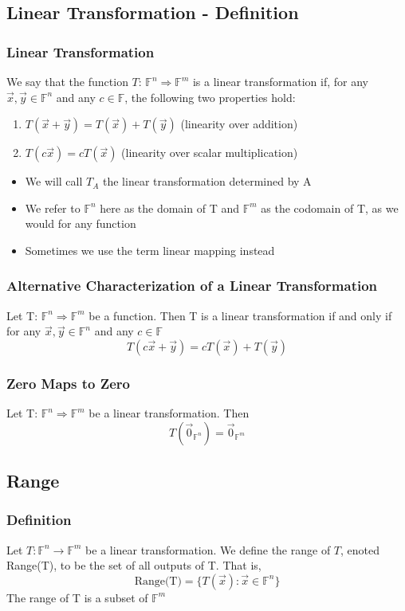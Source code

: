 \documentclass[12pt, letterpaper]{article}
\begin{document}
\subsection{Linear Transformation - Definition} 
\subsubsection{Linear Transformation}
We say that the function $T$: $\mathbb{F}^n\Rightarrow\mathbb{F}^m$ is a linear transformation if, for any $\vec{x}, \vec{y}\in\mathbb{F}^n$
and any $c\in\mathbb{F}$, the following two properties hold:
\begin{enumerate}
    \item $T(\vec{x}+\vec{y}) = T(\vec{x}) + T(\vec{y})$ (linearity over addition)
    \item $T(c\vec{x}) = cT(\vec{x})$ (linearity over scalar multiplication)
\end{enumerate}
\begin{itemize}
    \item We will call $T_A$ the linear transformation determined by A 
    \item We refer to $\mathbb{F}^n$ here as the domain of T and $\mathbb{F}^m$ as the codomain of T, as we would for any function 
    \item Sometimes we use the term linear mapping instead
\end{itemize}
\subsubsection{Alternative Characterization of a Linear Transformation}
Let T: $\mathbb{F}^n \Rightarrow \mathbb{F}^m$ be a function. Then T is a linear transformation if and only if for any 
$\vec{x}, \vec{y} \in \mathbb{F}^n$ and any $c\in\mathbb{F}$ \[T(c\vec{x}+\vec{y}) = cT(\vec{x}) + T(\vec{y})\]
\subsubsection{Zero Maps to Zero}
Let T: $\mathbb{F}^n\Rightarrow\mathbb{F}^m$ be a linear transformation. Then \[T(\vec{0}_{\mathbb{F}^n}) = \vec{0}_{\mathbb{F}^m}\]
\subsection{Range}
\subsubsection{Definition}
Let $T: \mathbb{F}^n \rightarrow\mathbb{F}^m$ be a linear transformation. We define the range of $T$, enoted Range(T), to be the set of all outputs of T. That is, 
\[\text{Range(T)} = \{T(\vec{x}): \vec{x}\in\mathbb{F}^n\}\]
The range of T is a subset of $\mathbb{F}^m$
\end{document}
